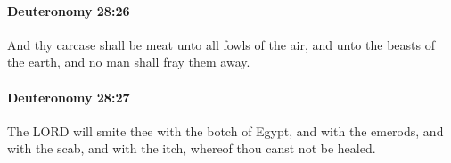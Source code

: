 		\paragraph{Deuteronomy 28:26} %
			\label{DEUTERONOMY-28-26}

			And thy carcase shall be meat unto all fowls of the air, and unto the beasts of the earth, and no man shall fray them away.


		\paragraph{Deuteronomy 28:27} %
			\label{DEUTERONOMY-28-27}

			The LORD will smite thee with the botch of Egypt, and with the emerods, and with the scab, and with the itch, whereof thou canst not be healed.


